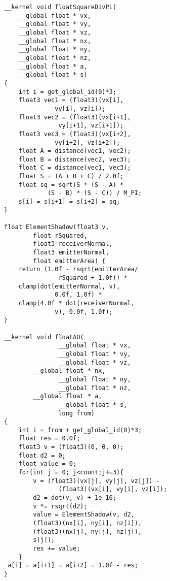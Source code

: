 \clearpage
{}
\begin{lstlisting}
__kernel void floatSquareDivPi(
    __global float * vx, 
    __global float * vy, 
    __global float * vz,
    __global float * nx, 
    __global float * ny, 
    __global float * nz, 
    __global float * a, 
    __global float * s)
{ 
    int i = get_global_id(0)*3;
    float3 vec1 = (float3)(vx[i], 
              vy[i], vz[i]); 
    float3 vec2 = (float3)(vx[i+1], 
               vy[i+1], vz[i+1]); 
    float3 vec3 = (float3)(vx[i+2], 
              vy[i+2], vz[i+2]); 
    float A = distance(vec1, vec2);
    float B = distance(vec2, vec3);
    float C = distance(vec1, vec3);
    float S = (A + B + C) / 2.0f;
    float sq = sqrt(S * (S - A) * 
            (S - B) * (S - C)) / M_PI;
    s[i] = s[i+1] = s[i+2] = sq;
}

float ElementShadow(float3 v, 
        float rSquared, 
        float3 receiverNormal, 
        float3 emitterNormal, 
        float emitterArea) {
    return (1.0f - rsqrt(emitterArea/
               rSquared + 1.0f)) *
    clamp(dot(emitterNormal, v), 
              0.0f, 1.0f) *
    clamp(4.0f * dot(receiverNormal, 
              v), 0.0f, 1.0f);
}

__kernel void floatAO(
               __global float * vx, 
               __global float * vy, 
               __global float * vz,
	    __global float * nx, 
               __global float * ny, 
               __global float * nz,
	    __global float * a, 
               __global float * s, 
               long from)
{ 
    int i = from + get_global_id(0)*3;
    float res = 0.0f;
    float3 v = (float3)(0, 0, 0);
    float d2 = 0;
    float value = 0;
    for(int j = 0; j<count;j+=3){
        v = (float3)(vx[j], vy[j], vz[j]) - 
               (float3)(vx[i], vy[i], vz[i]);
        d2 = dot(v, v) + 1e-16;                            
        v *= rsqrt(d2);
        value = ElementShadow(v, d2, 
        (float3)(nx[i], ny[i], nz[i]), 
        (float3)(nx[j], ny[j], nz[j]), 
        s[j]);
        res += value;
    }                        
 a[i] = a[i+1] = a[i+2] = 1.0f - res;
}
\end{lstlisting}

